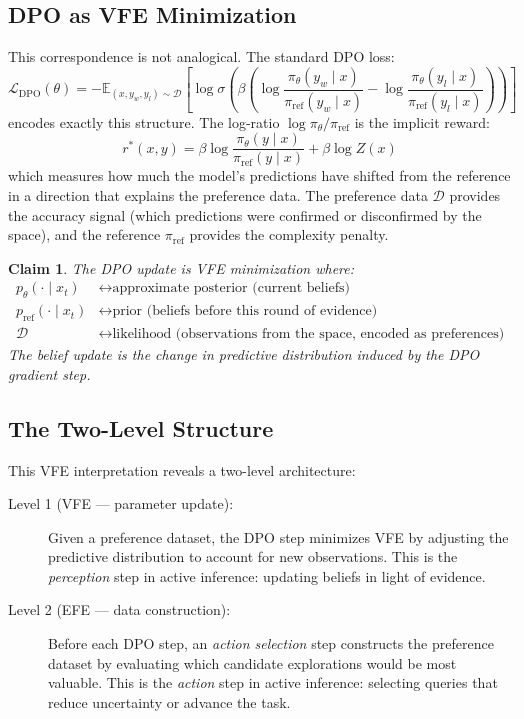 \documentclass[11pt]{article}
\newtheorem{claim}{Claim}
\begin{document}
\subsection{DPO as VFE Minimization}

This correspondence is not analogical. The standard DPO loss:
\begin{equation}
\label{eq:dpo}
\mathcal{L}_{\mathrm{DPO}}(\theta) = -\mathbb{E}_{(x, y_w, y_l) \sim \mathcal{D}} \left[ \log \sigma \left( \beta \left( \log \frac{\pi_\theta(y_w \mid x)}{\pi_{\mathrm{ref}}(y_w \mid x)} - \log \frac{\pi_\theta(y_l \mid x)}{\pi_{\mathrm{ref}}(y_l \mid x)} \right) \right) \right]
\end{equation}
encodes exactly this structure. The log-ratio $\log \pi_\theta / \pi_{\mathrm{ref}}$ is the implicit reward:
\begin{equation}
\label{eq:implicit-reward}
r^*(x, y) = \beta \log \frac{\pi_\theta(y \mid x)}{\pi_{\mathrm{ref}}(y \mid x)} + \beta \log Z(x)
\end{equation}
which measures how much the model's predictions have shifted from the reference in a direction that explains the preference data. The preference data $\mathcal{D}$ provides the accuracy signal (which predictions were confirmed or disconfirmed by the space), and the reference $\pi_{\mathrm{ref}}$ provides the complexity penalty.

\begin{claim}
\label{claim:dpo-vfe}
The DPO update is VFE minimization where:
\begin{align}
p_\theta(\cdot \mid x_t) &\leftrightarrow \text{approximate posterior (current beliefs)} \\
p_{\mathrm{ref}}(\cdot \mid x_t) &\leftrightarrow \text{prior (beliefs before this round of evidence)} \\
\mathcal{D} &\leftrightarrow \text{likelihood (observations from the space, encoded as preferences)}
\end{align}
The belief update \emph{is} the change in predictive distribution induced by the DPO gradient step.
\end{claim}


\subsection{The Two-Level Structure}

This VFE interpretation reveals a two-level architecture:

\begin{description}
    \item[Level 1 (VFE --- parameter update):] Given a preference dataset, the DPO step minimizes VFE by adjusting the predictive distribution to account for new observations. This is the \emph{perception} step in active inference: updating beliefs in light of evidence.
    \item[Level 2 (EFE --- data construction):] Before each DPO step, an \emph{action selection} step constructs the preference dataset by evaluating which candidate explorations would be most valuable. This is the \emph{action} step in active inference: selecting queries that reduce uncertainty or advance the task.
\end{description}
\end{document}
